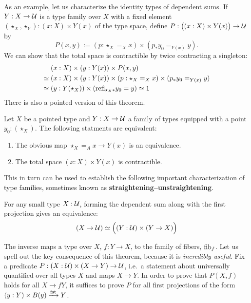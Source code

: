 \documentclass[10pt,oneside,leqno,openright]{memoir}
\begin{document}
As an example, let us characterize the identity types of dependent sums. If $Y:X\to\mathcal{U}$ is a type family over $X$ with a fixed element $(\star_X,\star_Y):(x:X)\times Y(x)$ of the type space,
define $P:\bigl((x:X)\times Y(x)\bigr) \to \mathcal{U}$ by
\begin{equation}\label{eq:dep-sum}
  P(x,y) := (p : \star_X=_X x) \times (p_* y_0 =_{Y(x)} y).
\end{equation}
We can show that the total space is contractible by twice contracting a singleton:
\begin{align*}
  &(x:X)\times(y:Y(x))\times P(x,y)\\
  \simeq\;
  &(x:X)\times(y:Y(x))\times(p : \star_X=_X x)\times(p_*y_0 =_{Y(x)}y)\\
  \simeq\;
  &(y:Y(\star_X))\times(\mathrm{refl}_{\star_X*}y_0 = y)
  \simeq 1
\end{align*}
%
There is also a pointed version of this theorem.
%
\begin{theorem}
  Let $X$ be a pointed type and $Y: X \to \mathcal{U}$ a family of types equipped with a point $y_0 : (\star_X)$. The following statments are equivalent:
  \begin{enumerate}
        \item The obvious map $\star_X =_A x \to Y(x)$  is an equivalence.
        \item The total space $(x : X) \times Y(x)$ is contractible.
    \end{enumerate}
\end{theorem}
%
This in turn can be used to establish the following important characterization of type families,
sometimes known as \textbf{straightening--unstraightening}.
\begin{theorem}
  For any small type $X:\mathcal{U}$, forming the dependent sum along with the first projection gives an equivalence:
  \[
    (X \to \mathcal{U}) \simeq \Bigl((Y : \mathcal{U}) \times (Y \to X)\Bigr)
  \]
\end{theorem}
The inverse maps a type over $X$, $f : Y\to X$, to the family of fibers, $\operatorname{fib}_f$.
%
Let us spell out the key consequence of this theorem, because it is \emph{incredibly useful}. Fix a predicate $P : (X : \mathcal{U}) \times (X \to Y) \to \mathcal{U}$, i.e.\ a statement about universally quantified over all types $X$ and maps $X \to Y$. In order to prove that $P(X,f)$ holds for all $X \rightarrow{f} Y$, it suffices to prove $P$ for all first projections of the form $(y:Y) \times B(y) \xrightarrow{\operatorname{fst}} Y$.  
\end{document}
